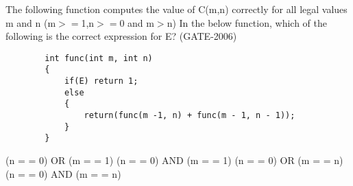 

\begin{questyle}
  \question  The following function computes the value of C(m,n) correctly for all legal values m and n (m\(>=\)1,n\(>=\)0 and m\(>\)n)
            In the below function, which of the following is the correct expression for E? (GATE-2006)

    \begin{lstlisting}
        int func(int m, int n)
        {
            if(E) return 1;
            else
            {
                return(func(m -1, n) + func(m - 1, n - 1));
            }
        }
    \end{lstlisting}

  \begin{choices}
    \CorrectChoice  (n = = 0) OR  (m = = 1)
    \choice         (n = = 0) AND (m = = 1)
    \choice         (n = = 0) OR  (m = = n)
    \choice         (n = = 0) AND (m = = n)
  \end{choices}
\end{questyle}
